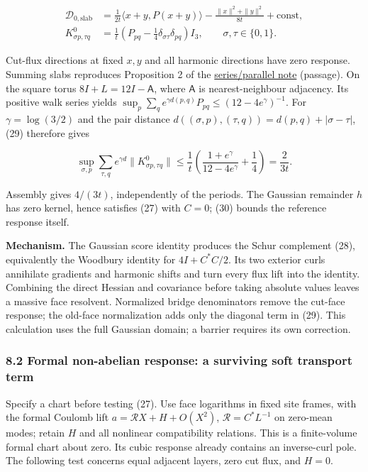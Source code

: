 \documentclass[11pt,a4paper]{article}
\begin{document}
\[\begin{aligned}
\mathcal D_{0,\mathrm{slab}}
&=\frac1{2t}\langle x+y,P(x+y)\rangle
 -\frac{\|x\|^2+\|y\|^2}{8t}+\mathrm{const},\\
K^0_{\sigma p,\tau q}
&=\frac1t\left(P_{pq}-\frac14\delta_{\sigma\tau}\delta_{pq}\right)I_3,
\qquad \sigma,\tau\in\{0,1\}.
\end{aligned}\tag{29}\]

Cut-flux directions at fixed \(x,y\) and all harmonic directions have
zero response. Summing slabs reproduces Proposition 2 of the
\href{series-parallel-gauge-refinement.md}{series/parallel note}
(passage). On the square torus \(8I+L=12I-\mathsf A\), where
\(\mathsf A\) is nearest-neighbour adjacency. Its positive walk series
yields \(\sup_p\sum_q e^{\gamma d(p,q)}P_{pq}\le(12-4e^\gamma)^{-1}\).
For \(\gamma=\log(3/2)\) and the pair distance
\(d((\sigma,p),(\tau,q))=d(p,q)+|\sigma-\tau|\), (29) therefore gives

\[\sup_{\sigma,p}\sum_{\tau,q}e^{\gamma d}
 \|K^0_{\sigma p,\tau q}\|
\le\frac1t\left(\frac{1+e^\gamma}{12-4e^\gamma}+\frac14\right)
=\frac{2}{3t}.\tag{30}\]

Assembly gives \(4/(3t)\), independently of the periods. The Gaussian
remainder \(h\) has zero kernel, hence satisfies (27) with \(C=0\); (30)
bounds the reference response itself.

\textbf{Mechanism.} The Gaussian score identity produces the Schur
complement (28), equivalently the Woodbury identity for \(4I+C^*C/2\).
Its two exterior curls annihilate gradients and harmonic shifts and turn
every flux lift into the identity. Combining the direct Hessian and
covariance before taking absolute values leaves a massive face
resolvent. Normalized bridge denominators remove the cut-face response;
the old-face normalization adds only the diagonal term in (29). This
calculation uses the full Gaussian domain; a barrier requires its own
correction.

\hypertarget{formal-non-abelian-response-a-surviving-soft-transport-term}{%
\subsubsection{8.2 Formal non-abelian response: a surviving soft
transport
term}\label{formal-non-abelian-response-a-surviving-soft-transport-term}}

Specify a chart before testing (27). Use face logarithms in fixed site
frames, with the formal Coulomb lift \(a=\mathcal R X+H+O(X^2)\),
\(\mathcal R=C^*L^{-1}\) on zero-mean modes; retain \(H\) and all
nonlinear compatibility relations. This is a finite-volume formal chart
about zero. Its cubic response already contains an inverse-curl pole.
The following test concerns equal adjacent layers, zero cut flux, and
\(H=0\).
\end{document}
